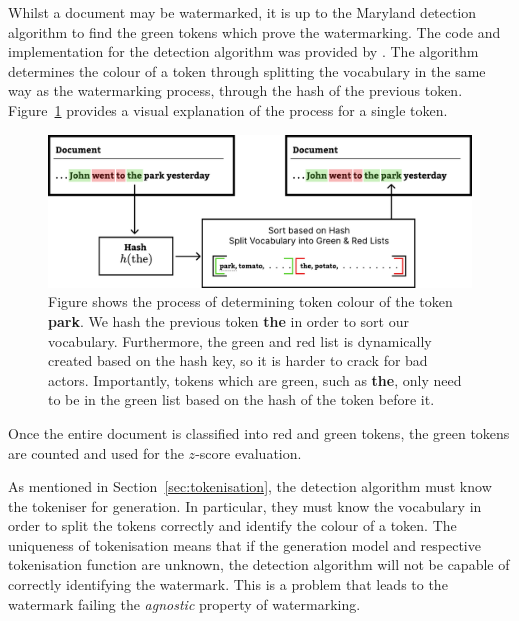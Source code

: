 \documentclass{l4proj}
\theoremstyle{definition}
\begin{document}
        Whilst a document may be watermarked, it is up to the Maryland detection algorithm to find the green tokens which prove the watermarking. The code and implementation for the detection algorithm was provided by \citet{kirchenbauer2023watermark}. The algorithm determines the colour of a token through splitting the vocabulary in the same way as the watermarking process, through the hash of the previous token. Figure~\ref{fig:maryland-detection-process} provides a visual explanation of the process for a single token.

        \begin{figure}[ht]
            \centering
            \includegraphics[width=1\linewidth, keepaspectratio]{images/methods/maryland-detection-process.pdf}
            \caption{Figure shows the process of determining token colour of the token \textbf{park}. We hash the previous token \textbf{the} in order to sort our vocabulary. Furthermore, the green and red list is dynamically created based on the hash key, so it is harder to crack for bad actors. Importantly, tokens which are green, such as \textbf{the}, only need to be in the green list based on the hash of the token before it.}
            \label{fig:maryland-detection-process}
        \end{figure}

        Once the entire document is classified into red and green tokens, the green tokens are counted and used for the $z$-score evaluation.

        As mentioned in Section~\ref{sec:tokenisation}, the detection algorithm must know the tokeniser for generation. In particular, they must know the vocabulary in order to split the tokens correctly and identify the colour of a token. The uniqueness of tokenisation means that if the generation model and respective tokenisation function are unknown, the detection algorithm will not be capable of correctly identifying the watermark. This is a problem that leads to the watermark failing the \emph{agnostic} property of watermarking.
\end{document}
